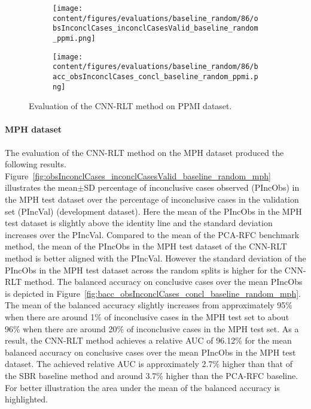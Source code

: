 \begin{figure}[ht]
  \begin{subfigure}{0.9\textwidth}
    \centering
    \texttt{[image: content/figures/evaluations/baseline\_random/86/obsInconclCases\_inconclCasesValid\_baseline\_random\_ppmi.png]}
    \label{fig:obsInconclCases_inconclCasesValid_baseline_random_ppmi}
  \end{subfigure}
  \hfill
  \begin{subfigure}{0.9\textwidth}
    \centering
    \texttt{[image: content/figures/evaluations/baseline\_random/86/bacc\_obsInconclCases\_concl\_baseline\_random\_ppmi.png]}
    \label{fig:bacc_obsInconclCases_concl_baseline_random_ppmi}
  \end{subfigure}
  \caption{Evaluation of the CNN-RLT method on PPMI dataset.}
  \label{fig:perf_eval_rlt_ppmi}
\end{figure}




\paragraph{MPH dataset}

The evaluation of the CNN-RLT method on the MPH dataset produced the following results.
Figure~\ref{fig:obsInconclCases_inconclCasesValid_baseline_random_mph} illustrates
the mean$\pm$SD percentage of inconclusive cases observed (PIncObs) in the MPH test dataset 
over the percentage of inconclusive cases in the validation set (PIncVal) (development dataset).
Here the mean of the PIncObs in the MPH test dataset is slightly above the identity line 
and the standard deviation increases over the PIncVal.
Compared to the mean of the PCA-RFC benchmark method, 
the mean of the PIncObs in the MPH test dataset of the CNN-RLT method is better aligned with the PIncVal.
However the standard deviation of the PIncObs in the MPH test dataset across the random splits 
is higher for the CNN-RLT method.
The balanced accuracy on conclusive cases over the mean PIncObs is depicted 
in Figure~\ref{fig:bacc_obsInconclCases_concl_baseline_random_mph}.
The mean of the balanced accuracy slightly increases from approximately 95\% 
when there are around 1\% of inconclusive cases in the MPH test set to about 96\% 
when there are around 20\% of inconclusive cases in the MPH test set.
As a result, the CNN-RLT method achieves a relative AUC of 96.12\% for the mean balanced accuracy on conclusive cases 
over the mean PIncObs in the MPH test dataset.
The achieved relative AUC is approximately 2.7\% higher than that of the SBR baseline method 
and around 3.7\% higher than the PCA-RFC baseline.
For better illustration the area under the mean of the balanced accuracy is highlighted.


